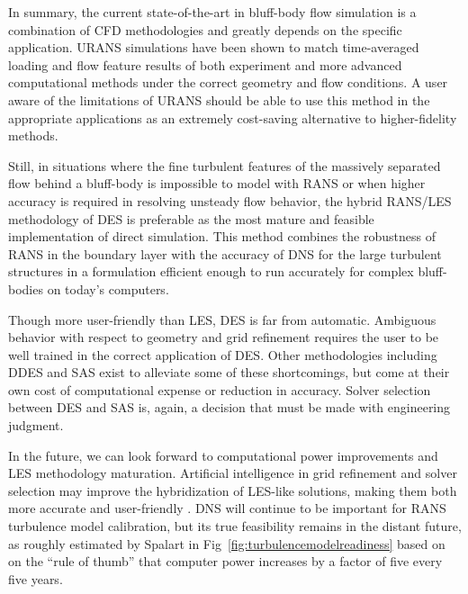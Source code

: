\documentclass[journal]{new-aiaa}
\begin{document}
In summary, the current state-of-the-art in bluff-body flow simulation is a combination of CFD methodologies and greatly depends on the specific application. URANS simulations have been shown to match time-averaged loading and flow feature results of both experiment and more advanced computational methods under the correct geometry and flow conditions. A user aware of the limitations of URANS should be able to use this method in the appropriate applications as an extremely cost-saving alternative to higher-fidelity methods.

Still, in situations where the fine turbulent features of the massively separated flow behind a bluff-body is impossible to model with RANS or when higher accuracy is required in resolving unsteady flow behavior, the hybrid RANS/LES methodology of DES is preferable as the most mature and feasible implementation of direct simulation. This method combines the robustness of RANS in the boundary layer with the accuracy of DNS for the large turbulent structures in a formulation efficient enough to run accurately for complex bluff-bodies on today's computers.

Though more user-friendly than LES, DES is far from automatic. Ambiguous behavior with respect to geometry and grid refinement requires the user to be well trained in the correct application of DES. Other methodologies including DDES and SAS exist to alleviate some of these shortcomings, but come at their own cost of computational expense or reduction in accuracy. Solver selection between DES and SAS is, again, a decision that must be made with engineering judgment.

In the future, we can look forward to computational power improvements and LES methodology maturation. Artificial intelligence in grid refinement and solver selection may improve the hybridization of LES-like solutions, making them both more accurate and user-friendly \cite{spalart2000strategies}. DNS will continue to be important for RANS turbulence model calibration, but its true feasibility remains in the distant future, as roughly estimated by Spalart in Fig~\ref{fig:turbulencemodelreadiness} based on on the ``rule of thumb'' that computer power increases by a factor of five every five years.
\end{document}
